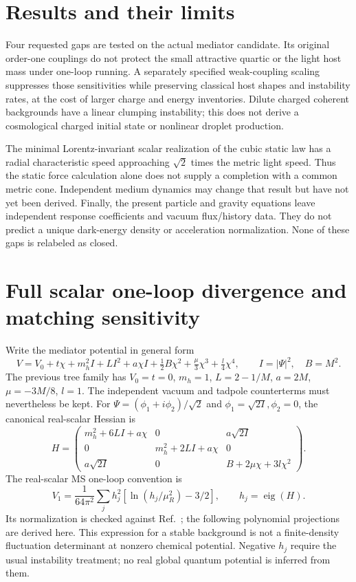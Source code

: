 \documentclass[11pt]{article}
\begin{document}
\section{Results and their limits}
Four requested gaps are tested on the actual mediator candidate. Its
original order-one couplings do not protect the small attractive quartic
or the light host mass under one-loop running. A separately specified
weak-coupling scaling suppresses those sensitivities while preserving
classical host shapes and instability rates, at the cost of larger charge
and energy inventories. Dilute charged coherent backgrounds have a linear
clumping instability; this does not derive a cosmological charged initial
state or nonlinear droplet production.

The minimal Lorentz-invariant scalar realization of the cubic static law
has a radial characteristic speed approaching $\sqrt2$ times the metric
light speed. Thus the static force calculation alone does not supply a
completion with a common metric cone. Independent medium dynamics may
change that result but have not yet been derived. Finally, the present
particle and gravity equations leave independent response coefficients and
vacuum flux/history data. They do not predict a unique dark-energy density
or acceleration normalization. None of these gaps is relabeled as closed.

\section{Full scalar one-loop divergence and matching sensitivity}
Write the mediator potential in general form
\begin{equation}
 V=V_0+t\chi+m_h^2 I+L I^2+a\chi I+
 \tfrac12 B\chi^2+\tfrac\mu3\chi^3+\tfrac l4\chi^4,
 \qquad I=|\Psi|^2,\quad B=M^2.
\end{equation}
The previous tree family has $V_0=t=0$, $m_h=1$,
$L=2-1/M$, $a=2M$, $\mu=-3M/8$, $l=1$.
The independent vacuum and tadpole counterterms must nevertheless be kept.
For $\Psi=(\phi_1+i\phi_2)/\sqrt2$ and
$\phi_1=\sqrt{2I},\phi_2=0$, the canonical real-scalar Hessian is
\begin{equation}
 H=\begin{pmatrix}
 m_h^2+6LI+a\chi&0&a\sqrt{2I}\\
 0&m_h^2+2LI+a\chi&0\\
 a\sqrt{2I}&0&B+2\mu\chi+3l\chi^2
 \end{pmatrix}.
\end{equation}
The real-scalar MS one-loop convention is
\begin{equation}
 V_1=\frac{1}{64\pi^2}\sum_j h_j^2
       [\ln(h_j/\mu_R^2)-3/2],\qquad h_j=\operatorname{eig}(H).
\end{equation}
Its normalization is checked against Ref.~\cite{qfg:Martin}; the following
polynomial projections are derived here. This expression for a stable
background is not a finite-density fluctuation determinant at nonzero
chemical potential. Negative $h_j$ require the usual instability treatment;
no real global quantum potential is inferred from them.
\end{document}

